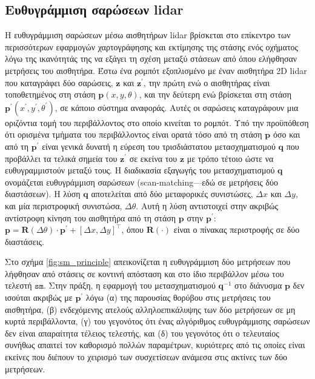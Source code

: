 \subsection{Ευθυγράμμιση σαρώσεων lidar}
\label{subsec:01_01_02_5}

Η ευθυγράμμιση σαρώσεων μέσω αισθητήρων lidar βρίσκεται στο επίκεντρο
των περισσότερων εφαρμογών χαρτογράφησης και εκτίμησης
της στάσης ενός οχήματος λόγω της ικανότητάς της να εξάγει τη σχέση μεταξύ
στάσεων από όπου ελήφθησαν μετρήσεις του αισθητήρα. Έστω ένα ρομπότ εξοπλισμένο
με έναν αισθητήρα 2D lidar που καταγράφει δύο σαρώσεις, $\bm{z}$ και
$\bm{z^{\prime}}$, την πρώτη ενώ ο αισθητήρας είναι τοποθετημένος στη στάση
$\bm{p}(x,y,\theta)$, και την δεύτερη ενώ βρίσκεται στη στάση
$\bm{p}^{\prime}(x^{\prime},y^{\prime},\theta^{\prime})$, σε κάποιο σύστημα
αναφοράς. Αυτές οι σαρώσεις καταγράφουν μια οριζόντια τομή του περιβάλλοντος
στο οποίο κινείται το ρομπότ. Υπό την προϋπόθεση ότι ορισμένα τμήματα του
περιβάλλοντος είναι ορατά τόσο από τη στάση $\bm{p}$ όσο και από τη
$\bm{p}^{\prime}$ είναι γενικά δυνατή η εύρεση του τρισδιάστατου
μετασχηματισμού $\bm{q}$ που προβάλλει τα τελικά σημεία του $\bm{z}^{\prime}$
σε εκείνα του $\bm{z}$ με τρόπο τέτοιο ώστε να ευθυγραμμιστούν μεταξύ τους. Η
διαδικασία εξαγωγής του μετασχηματισμού $\bm{q}$ ονομάζεται ευθυγράμμιση
σαρώσεων (scan-matching---εδώ σε μετρήσεις δύο διαστάσεων). Η λύση $\bm{q}$
αποτελείται από δύο μεταφορικές συνιστώσες, $\Delta x$ και $\Delta y$, και μία
περιστροφική συνιστώσα, $\Delta\theta$. Αυτή η λύση αντιστοιχεί στην ακριβώς
αντίστροφη κίνηση του αισθητήρα από τη στάση $\bm{p}$ στην $\bm{p}^{\prime}$:
$\bm{p} = \bm{R}(\Delta\theta) \cdot \bm{p}^{\prime} + [\Delta x, \Delta
y]^{\top}$, όπου $\bm{R}(\cdot)$ είναι ο πίνακας περιστροφής σε δύο διαστάσεις.

Στο σχήμα \ref{fig:sm_principle} απεικονίζεται η ευθυγράμμιση δύο μετρήσεων που
λήφθησαν από στάσεις σε κοντινή απόσταση και στο ίδιο περιβάλλον μέσω του
τελεστή $\texttt{sm}$. Στην πράξη, η εφαρμογή του μετασχηματισμού $\bm{q}^{-1}$
στο διάνυσμα $\bm{p}$ δεν ισούται ακριβώς με $\bm{p}^\prime$ λόγω (α) της
παρουσίας θορύβου στις μετρήσεις του αισθητήρα, (β) ενδεχόμενης ατελούς
αλληλοεπικάλυψης των δύο μετρήσεων σε μη κυρτά περιβάλλοντα, (γ) του γεγονότος
ότι ένας αλγόριθμος ευθυγράμμισης σαρώσεων δεν είναι απαραίτητα τέλειος
τελεστής, και (δ) του γεγονότος ότι ο τελευταίος συνήθως απαιτεί τον καθορισμό
πολλών παραμέτρων, κυριότερες από τις οποίες είναι εκείνες που διέπουν το
χειρισμό των συσχετίσεων ανάμεσα στις ακτίνες των δύο μετρήσεων.

